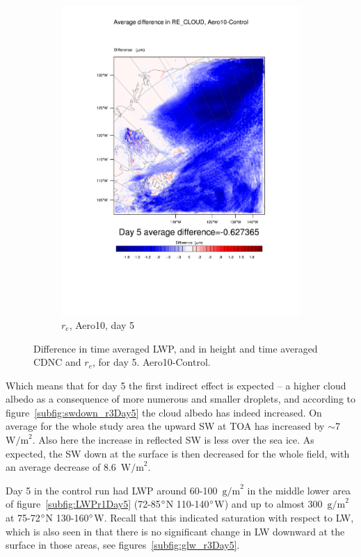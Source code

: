 \begin{figure}[hb]
\begin{subfigure}{0.48\textwidth}
		\includegraphics[width=\textwidth]{results/aero10/diff_Aero10_RE_CLOUD_Day5.pdf}
		\caption{$r_e$, Aero10, day 5}
		\label{subfig:recloud_r3Day5}
	\end{subfigure}
	\caption{Difference in time averaged LWP, and in height and time averaged CDNC and $r_e$, for day 5. Aero10-Control.}
	\label{fig:lwpcdncre_r3Day5}
\end{figure}

Which means that for day 5 the first indirect effect is expected -- a higher cloud albedo as a consequence of more numerous and smaller droplets, and according to figure~\ref{subfig:swdown_r3Day5} the cloud albedo has indeed increased. On average for the whole study area the upward SW at TOA has increased by $\sim$7~$\text{W/m}^2$. Also here the increase in reflected SW is less over the sea ice. As expected, the SW down at the surface is then decreased for the whole field, with an average decrease of 8.6~$\text{W/m}^2$.

Day 5 in the control run had LWP around 60-100~$\text{g/m}^2$ in the middle lower area of figure~\ref{subfig:LWPr1Day5} (72-85$\degree$N 110-140$\degree$W) and up to almost 300~$\text{g/m}^2$ at 75-72$\degree$N 130-160$\degree$W. Recall that this indicated saturation with respect to LW, which is also seen in that there is no significant change in LW downward at the surface in those areas, see figures~\ref{subfig:glw_r3Day5}.

